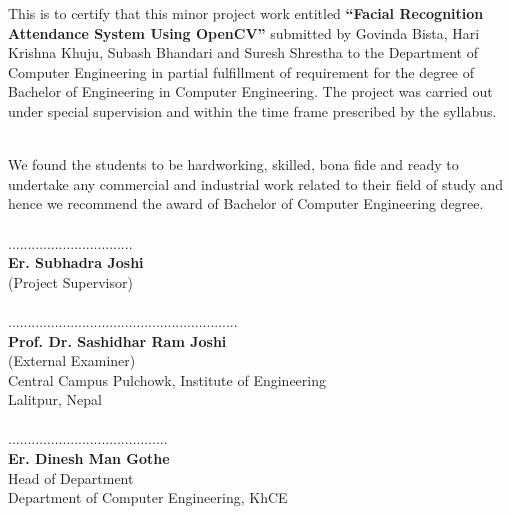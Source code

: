 		\large
		\begin{normalsize}
			\justify
This is to  certify that this minor project  work entitled \textbf{“Facial Recognition Attendance System Using OpenCV”} submitted by Govinda Bista, Hari Krishna Khuju,
Subash Bhandari and Suresh Shrestha to the Department of Computer Engineering in partial fulfillment of requirement for
the degree of Bachelor of Engineering in Computer Engineering. The project was
carried out under special supervision and within the time frame prescribed by the
syllabus.
\end{normalsize}
\\
We found the students to be hardworking, skilled, bona fide and ready to undertake any
commercial and industrial work related to their field of study and hence we recommend
the award of Bachelor of Computer Engineering degree.\\
\vspace{1.5cm}
\\
................................\\
\textbf{Er. Subhadra Joshi}\\
(Project Supervisor)\\
\vspace{1.5cm}
\\
...........................................................\\
\textbf{Prof. Dr. Sashidhar Ram Joshi}\\
(External Examiner)\\
Central Campus Pulchowk, Institute of Engineering\\
Lalitpur, Nepal\\
\vspace{1.5cm}\\
.........................................\\
\textbf{Er. Dinesh Man Gothe}\\
Head of Department\\
Department of Computer Engineering, KhCE\\
        \break



